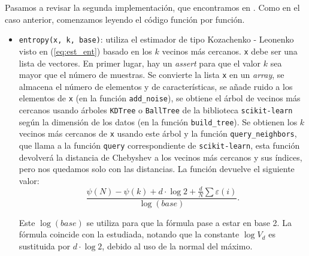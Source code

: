 \documentclass[12pt,a4paper]{report} %
\theoremstyle{definition}
\begin{document}
Pasamos a revisar la segunda implementación, que encontramos en \cite{npeet}. Como en el caso anterior, comenzamos leyendo el código función por función. 
\begin{itemize}
\item \texttt{entropy(x, k, base)}: utiliza el estimador de tipo Kozachenko - Leonenko visto en (\ref{eq:est_ent}) basado en los $k$ vecinos más cercanos. \texttt{x} debe ser una lista de vectores. En primer lugar, hay un \textit{assert} para que el valor $k$ sea mayor que el número de muestras. Se convierte la lista \texttt{x} en un \textit{array}, se almacena el número de elementos y de características, se añade ruido a los elementos de \texttt{x} (en la función \texttt{add\_noise}), se obtiene el árbol de vecinos más cercanos usando árboles \texttt{KDTree} o \texttt{BallTree} de la biblioteca \texttt{scikit-learn} según la dimensión de los datos (en la función \texttt{build\_tree}). Se obtienen los $k$ vecinos más cercanos de \texttt{x} usando este árbol y la función \texttt{query\_neighbors}, que llama a la función \texttt{query} correspondiente de \texttt{scikit-learn}, esta función devolverá la distancia de Chebyshev a los vecinos más cercanos y sus índices, pero nos quedamos solo con las distancias. La función devuelve el siguiente valor:\[
  \frac{\psi(N) - \psi(k) + d \cdot \log 2 + \frac{d}{N}\sum \varepsilon(i)}{\log(base)}.
  \]

  Este $\log (base)$ se utiliza para que la fórmula pase a estar en base 2. La fórmula coincide con la estudiada, notando que la constante $\log V_d$ es sustituida por $d \cdot \log 2$, debido al uso de la normal del máximo.


\end{itemize}
\end{document}
